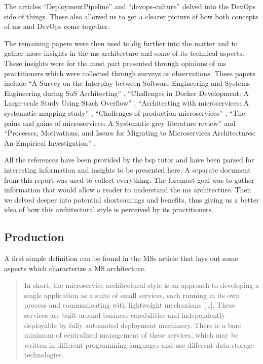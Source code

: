 The articles \enquote{DeploymentPipeline} \cite{pipelines} and
\enquote{devops-culture} \cite{devops-culture} delved into the DevOps
side of things. These also allowed us to get a clearer picture of how
both concepts of \gls{ms} and DevOps come together.

The remaining papers were then used to dig further into the matter and
to gather more insights in the \gls{ms} architecture and some of its
technical aspects. These insights were for the most part presented
through opinions of \gls{ms} practitioners which were collected
through surveys or observations. These papers include 
\enquote{A Survey on the Interplay between Software Engineering and Systems Engineering during SoS Architecting}
\cite{sos-survey},
\enquote{Challenges in Docker Development: A Large-scale Study Using Stack Overflow}
\cite{docker-so},
\enquote{Architecting with microservices: A systematic mapping study}
\cite{ms-arch-study},
\enquote{Challenges of production microservices}
\cite{ms-challenges},
\enquote{The pains and gains of microservices: A Systematic grey literature review}
\cite{ms-pains-gains} and
\enquote{Processes, Motivations, and Issues for Migrating to Microservices Architectures: An Empirical Investigation}
\cite{ms-migration}.

All the references have been provided by the \gls{bsp} tutor and have
been parsed for interesting information and insights to be presented
here. A separate document from this report was used to collect
everything. The foremost goal was to gather information that would
allow a reader to understand the \gls{ms} architecture. Then we delved
deeper into potential shortcomings and benefits, thus giving us a
better idea of how this architectural style is perceived by its
practitioners.

\subsection{Production}%

A first simple definition can be found in the MSs article
\cite{ms-definition} that lays out some aspects which characterize a
MS architecture.

\begin{quote}
	In short, the microservice architectural style is an approach to
	developing a single application as a suite of small services,
	each running in its own process and communicating with lightweight
	mechanisms [\ldots]. These services are built around business
	capabilities and independently deployable by fully automated
	deployment machinery.  There
	is a bare minimum of centralized management of these services, which
	may be written in different programming languages and use different
	data storage technologies. 
\end{quote}

